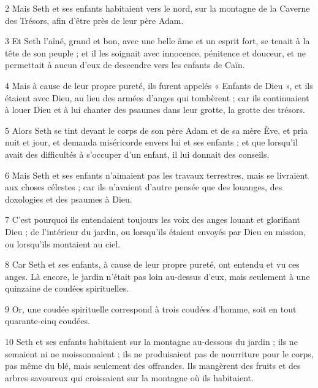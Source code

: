 \par 2 Mais Seth et ses enfants habitaient vers le nord, sur la montagne de la Caverne des Trésors, afin d'être près de leur père Adam.

\par 3 Et Seth l'aîné, grand et bon, avec une belle âme et un esprit fort, se tenait à la tête de son peuple ; et il les soignait avec innocence, pénitence et douceur, et ne permettait à aucun d'eux de descendre vers les enfants de Caïn.

\par 4 Mais à cause de leur propre pureté, ils furent appelés « Enfants de Dieu », et ils étaient avec Dieu, au lieu des armées d'anges qui tombèrent ; car ils continuaient à louer Dieu et à lui chanter des psaumes dans leur grotte, la grotte des trésors.

\par 5 Alors Seth se tint devant le corps de son père Adam et de sa mère Ève, et pria nuit et jour, et demanda miséricorde envers lui et ses enfants ; et que lorsqu'il avait des difficultés à s'occuper d'un enfant, il lui donnait des conseils.

\par 6 Mais Seth et ses enfants n'aimaient pas les travaux terrestres, mais se livraient aux choses célestes ; car ils n'avaient d'autre pensée que des louanges, des doxologies et des psaumes à Dieu.

\par 7 C'est pourquoi ils entendaient toujours les voix des anges louant et glorifiant Dieu ; de l'intérieur du jardin, ou lorsqu'ils étaient envoyés par Dieu en mission, ou lorsqu'ils montaient au ciel.

\par 8 Car Seth et ses enfants, à cause de leur propre pureté, ont entendu et vu ces anges. Là encore, le jardin n’était pas loin au-dessus d’eux, mais seulement à une quinzaine de coudées spirituelles.

\par 9 Or, une coudée spirituelle correspond à trois coudées d'homme, soit en tout quarante-cinq coudées.

\par 10 Seth et ses enfants habitaient sur la montagne au-dessous du jardin ; ils ne semaient ni ne moissonnaient ; ils ne produisaient pas de nourriture pour le corps, pas même du blé, mais seulement des offrandes. Ils mangèrent des fruits et des arbres savoureux qui croissaient sur la montagne où ils habitaient.

